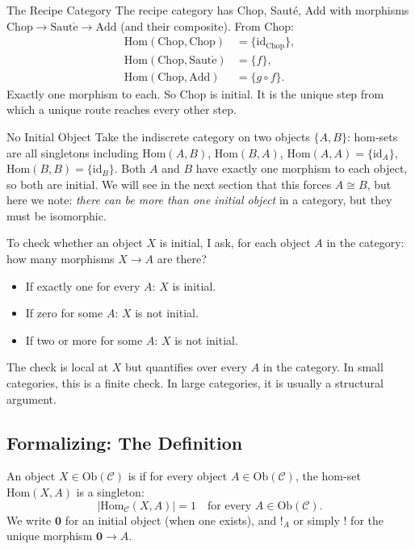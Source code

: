 \begin{example}{The Recipe Category}
The recipe category has Chop, Sauté, Add with morphisms
$\mathrm{Chop} \to \mathrm{Saut\acute{e}} \to \mathrm{Add}$ (and their
composite). From Chop:
\begin{align*}
  \mathrm{Hom}(\mathrm{Chop}, \mathrm{Chop}) &= \{\mathrm{id}_{\mathrm{Chop}}\}, \\
  \mathrm{Hom}(\mathrm{Chop}, \mathrm{Saut\acute{e}}) &= \{f\}, \\
  \mathrm{Hom}(\mathrm{Chop}, \mathrm{Add}) &= \{g \circ f\}.
\end{align*}
Exactly one morphism to each. So Chop is initial. It is the unique step
from which a unique route reaches every other step.
\end{example}

\begin{example}{No Initial Object}
Take the indiscrete category on two objects $\{A, B\}$: hom-sets are
all singletons including $\mathrm{Hom}(A, B)$, $\mathrm{Hom}(B, A)$,
$\mathrm{Hom}(A, A) = \{\mathrm{id}_A\}$, $\mathrm{Hom}(B, B) =
\{\mathrm{id}_B\}$. Both $A$ and $B$ have exactly one morphism to each
object, so both are initial. We will see in the next section that this
forces $A \cong B$, but here we note: \emph{there can be more than one
initial object} in a category, but they must be isomorphic.
\end{example}

\begin{dialog}
To check whether an object $X$ is initial, I ask, for each object $A$ in the
category: how many morphisms $X \to A$ are there?
\begin{itemize}
  \item If exactly one for every $A$: $X$ is initial.
  \item If zero for some $A$: $X$ is not initial.
  \item If two or more for some $A$: $X$ is not initial.
\end{itemize}
The check is local at $X$ but quantifies over every $A$ in the category. In
small categories, this is a finite check. In large categories, it is usually
a structural argument.
\end{dialog}

\subsection{Formalizing: The Definition}

An object $X \in \mathrm{Ob}(\mathcal{C})$ is  if for every
object $A \in \mathrm{Ob}(\mathcal{C})$, the hom-set $\mathrm{Hom}(X, A)$
is a singleton:
\begin{equation*}
  | \mathrm{Hom}_{\mathcal{C}}(X, A) | = 1
  \quad \text{for every } A \in \mathrm{Ob}(\mathcal{C}).
\end{equation*}
We write $\mathbf{0}$ for an initial object (when one exists), and $!_A$
or simply $!$ for the unique morphism $\mathbf{0} \to A$.

